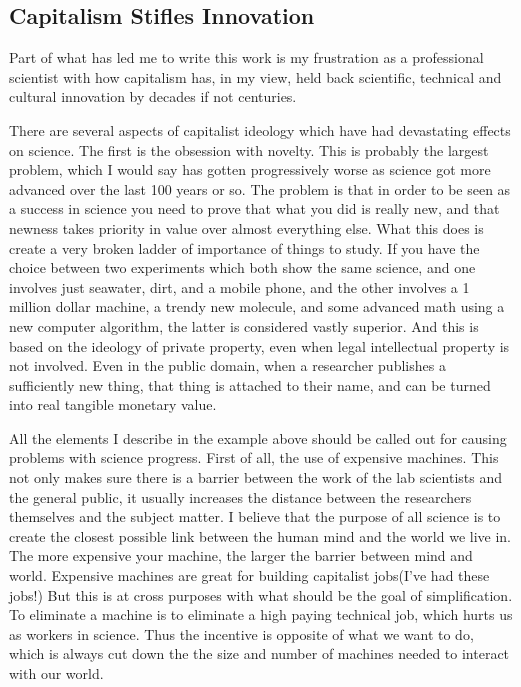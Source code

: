 \subsection{Capitalism Stifles
Innovation}\label{capitalism-stifles-innovation}

Part of what has led me to write this work is my frustration as a
professional scientist with how capitalism has, in my view, held back
scientific, technical and cultural innovation by decades if not
centuries.

There are several aspects of capitalist ideology which have had
devastating effects on science. The first is the obsession with novelty.
This is probably the largest problem, which I would say has gotten
progressively worse as science got more advanced over the last 100 years
or so. The problem is that in order to be seen as a success in science
you need to prove that what you did is really new, and that newness
takes priority in value over almost everything else. What this does is
create a very broken ladder of importance of things to study. If you
have the choice between two experiments which both show the same
science, and one involves just seawater, dirt, and a mobile phone, and
the other involves a 1 million dollar machine, a trendy new molecule,
and some advanced math using a new computer algorithm, the latter is
considered vastly superior. And this is based on the ideology of private
property, even when legal intellectual property is not involved. Even in
the public domain, when a researcher publishes a sufficiently new thing,
that thing is attached to their name, and can be turned into real
tangible monetary value.

All the elements I describe in the example above should be called out
for causing problems with science progress. First of all, the use of
expensive machines. This not only makes sure there is a barrier between
the work of the lab scientists and the general public, it usually
increases the distance between the researchers themselves and the
subject matter. I believe that the purpose of all science is to create
the closest possible link between the human mind and the world we live
in. The more expensive your machine, the larger the barrier between mind
and world. Expensive machines are great for building capitalist
jobs(I've had these jobs!) But this is at cross purposes with what
should be the goal of simplification. To eliminate a machine is to
eliminate a high paying technical job, which hurts us as workers in
science. Thus the incentive is opposite of what we want to do, which is
always cut down the the size and number of machines needed to interact
with our world.

